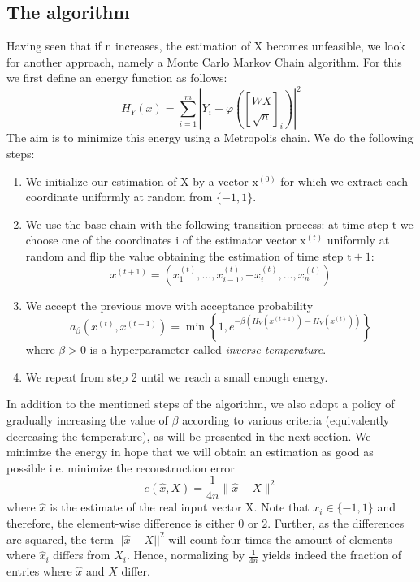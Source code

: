 \documentclass{scrartcl}
\begin{document}
\subsection{The algorithm}
Having seen that if $\mathrm{n}$ increases, the estimation of $\mathrm{X}$ becomes unfeasible, we look for another approach, namely a Monte Carlo Markov Chain algorithm.
For this we first define an energy function as follows:
\begin{equation}
H_Y(x) = \sum_{i=1}^m \left| Y_i - \varphi \left( \left[ \frac{WX}{\sqrt{n}} \right]_i \right) \right|^2
\end{equation}
The aim is to minimize this energy using a Metropolis chain. We do the following steps:
\begin{enumerate}
    \item We initialize our estimation of $\mathrm{X}$ by a vector $\mathrm{x}^{(0)}$ for which we extract each coordinate uniformly at random from $\{-1, 1\}$.
    \item We use the base chain with the following transition process: at time step $\mathrm{t}$ we choose one of the coordinates $\mathrm{i}$ of the estimator vector $\mathrm{x}^{(t)}$ uniformly at random and flip the value obtaining the estimation of time step $\mathrm{t}+1$:
    \begin{equation}
        x^{(t+1)} = \left( x_1^{(t)}, ..., x_{i-1}^{(t)}, -x_i^{(t)}, ..., x_n^{(t)} \right)
    \end{equation}
    \item We accept the previous move with acceptance probability
    \begin{equation}
        a_{\beta}(x^{(t)}, x^{(t+1)}) = \min \left\{ 1, e^{-\beta \left( H_Y(x^{(t+1)}) - H_Y(x^{(t)}) \right)} \right\}
    \end{equation} where $\beta > 0$ is a hyperparameter called \textit{inverse temperature}.
    \item We repeat from step 2 until we reach a small enough energy.
\end{enumerate}
In addition to the mentioned steps of the algorithm, we also adopt a policy of gradually increasing the value of $\beta$ according to various criteria (equivalently decreasing the temperature), as will be presented in the next section.
We minimize the energy in hope that we will obtain an estimation as good as possible i.e. minimize the reconstruction error
\begin{equation}
    e(\hat{x}, X) = \frac{1}{4n} \|\hat{x} - X\|^2
\end{equation}
where $\hat{x}$ is the estimate of the real input vector $\mathrm{X}$. Note that $x_i \in \{-1, 1\}$ and therefore, the element-wise difference is either $0$ or $2$. Further, as the differences are squared, the term ${||\hat{x} - X||^2}$ will count four times the amount of elements where $\hat{x}_i$ differs from $X_i$. Hence, normalizing by $\frac{1}{4n}$ yields indeed the fraction of entries where $\hat{x}$ and $X$ differ.
\end{document}
